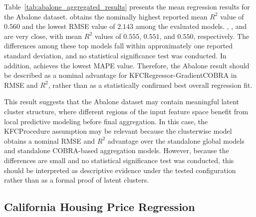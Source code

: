 \hs Table~\ref{tab:abalone_aggregated_results} presents the mean regression results for the Abalone dataset.  obtains the nominally highest reported mean $R^2$ value of $0.560$ and the lowest RMSE value of $2.143$ among the evaluated models. , , and  are very close, with mean $R^2$ values of $0.555$, $0.551$, and $0.550$, respectively. The differences among these top models fall within approximately one reported standard deviation, and no statistical significance test was conducted. In addition,  achieves the lowest MAPE value. Therefore, the Abalone result should be described as a nominal advantage for KFCRegressor-GradientCOBRA in RMSE and $R^2$, rather than as a statistically confirmed best overall regression fit.


This result suggests that the Abalone dataset may contain meaningful latent cluster structure, where different regions of the input feature space benefit from local predictive modeling before final aggregation. In this case, the KFCProcedure assumption may be relevant because the clusterwise model obtains a nominal RMSE and $R^2$ advantage over the standalone global models and standalone COBRA-based aggregation models. However, because the differences are small and no statistical significance test was conducted, this should be interpreted as descriptive evidence under the tested configuration rather than as a formal proof of latent clusters.

\subsection{California Housing Price Regression}

